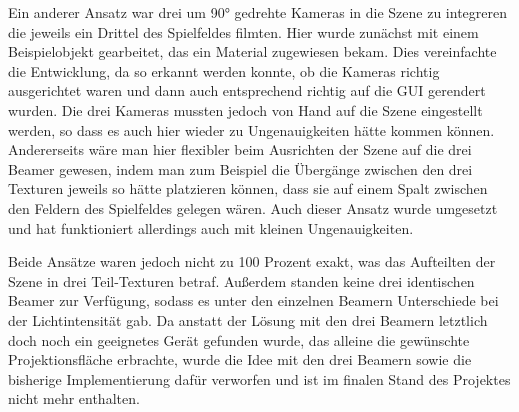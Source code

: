 Ein anderer Ansatz war drei um 90° gedrehte Kameras in die Szene zu integreren die jeweils ein Drittel des Spielfeldes filmten. Hier wurde zunächst mit einem Beispielobjekt gearbeitet, das ein Material zugewiesen bekam. Dies vereinfachte die Entwicklung, da so erkannt werden konnte, ob die Kameras richtig ausgerichtet waren und dann auch entsprechend richtig auf die GUI gerendert wurden. Die drei Kameras mussten jedoch von Hand auf die Szene eingestellt werden, so dass es auch hier wieder zu Ungenauigkeiten hätte kommen können. Andererseits wäre man hier flexibler beim Ausrichten der Szene auf die drei Beamer gewesen, indem man zum Beispiel die Übergänge zwischen den drei Texturen jeweils so hätte platzieren können, dass sie auf einem Spalt zwischen den Feldern des Spielfeldes gelegen wären. Auch dieser Ansatz wurde umgesetzt und hat funktioniert allerdings auch mit kleinen Ungenauigkeiten.

Beide Ansätze waren jedoch nicht zu 100 Prozent exakt, was das Aufteilten der Szene in drei Teil-Texturen betraf. Außerdem standen keine drei identischen Beamer zur Verfügung, sodass es unter den einzelnen Beamern Unterschiede bei der Lichtintensität gab. Da anstatt der Lösung mit den drei Beamern letztlich doch noch ein geeignetes Gerät gefunden wurde, das alleine die gewünschte Projektionsfläche erbrachte, wurde die Idee mit den drei Beamern sowie die bisherige Implementierung dafür verworfen und ist im finalen Stand des Projektes nicht mehr enthalten.